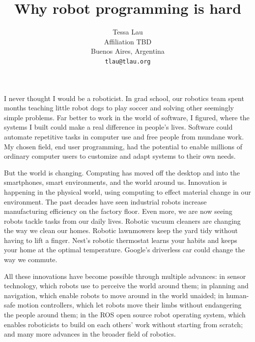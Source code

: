 \documentclass[10pt,twocolumn]{article}
\begin{document}
\title {Why robot programming is hard}
\author {Tessa Lau \\
Affiliation TBD \\
Buenos Aires, Argentina \\
{\tt tlau@tlau.org}
}
\maketitle





I never thought I would be a roboticist. In grad school, our robotics team spent months teaching little robot dogs to play soccer and solving other seemingly simple problems. Far better to work in the world of software, I figured, where the systems I built could make a real difference in people's lives. Software could automate repetitive tasks in computer use and free people from mundane work. My chosen field, end user programming, had the potential to enable millions of ordinary computer users to customize and adapt systems to their own needs.

But the world is changing. Computing has moved off the desktop and into the smartphones, smart environments, and the world around us. Innovation is happening in the physical world, using computing to effect material change in our environment. The past decades have seen industrial robots increase manufacturing efficiency on the factory floor. Even more, we are now seeing robots tackle tasks from our daily lives. Robotic vacuum cleaners are changing the way we clean our homes. Robotic lawnmowers keep the yard tidy without having to lift a finger. Nest's robotic thermostat learns your habits and keeps your home at the optimal temperature. Google's driverless car could change the way we commute.

All these innovations have become possible through multiple advances: in sensor technology, which robots use to perceive the world around them; in planning and navigation, which enable robots to move around in the world unaided; in human-safe motion controllers, which let robots move their limbs without endangering the people around them; in the ROS open source robot operating system, which enables roboticists to build on each others' work without starting from scratch; and many more advances in the broader field of robotics.
\end{document}
